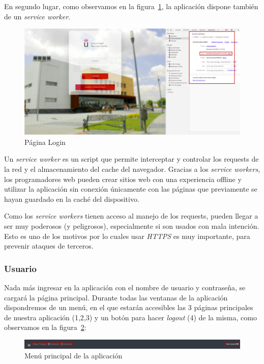 \documentclass[a4paper, 12pt]{book}
\begin{document}
\clearpage
	En segundo lugar, como observamos en la figura~\ref{fig:principalWorker}, la aplicación dispone también de un \textit{service worker}.
	
	\begin{figure}[h!]
  	\centering
  	\includegraphics[width=16cm, keepaspectratio]{img/principalWorker.png}
  	\caption{Página Login}\label{fig:principalWorker}
	\end{figure}

	Un \emph{service worker} es un script que permite interceptar y controlar los requests de la red y el almacenamiento del cache del navegador. Gracias a los \textit{service workers}, los programadores web pueden crear sitios web con una experiencia offline y utilizar la aplicación sin conexión únicamente con las páginas que previamente se hayan guardado en la caché del dispositivo.
	
	Como los \textit{service workers} tienen acceso al manejo de los requests, pueden llegar a ser muy poderosos (y peligrosos), especialmente si son usados con mala intención. Esto es uno de los motivos por lo cuales usar \textit{HTTPS} es muy importante, para prevenir ataques de terceros.

\clearpage

\subsubsection{Usuario}
	Nada más ingresar en la aplicación con el nombre de usuario y contraseña, se cargará la página principal. Durante todas las ventanas de la aplicación dispondremos de un menú, en el que estarán accesibles las 3 páginas principales de nuestra aplicación (1,2,3) y un botón para hacer \textit{logout} (4) de la misma, como observamos en la figura~\ref{fig:menu}:
	\begin{figure}[h!]
  	\centering
  	\includegraphics[width=16cm, keepaspectratio]{img/menu.png}
  	\caption{Menú principal de la aplicación}\label{fig:menu}
	\end{figure}
	
\end{document}
